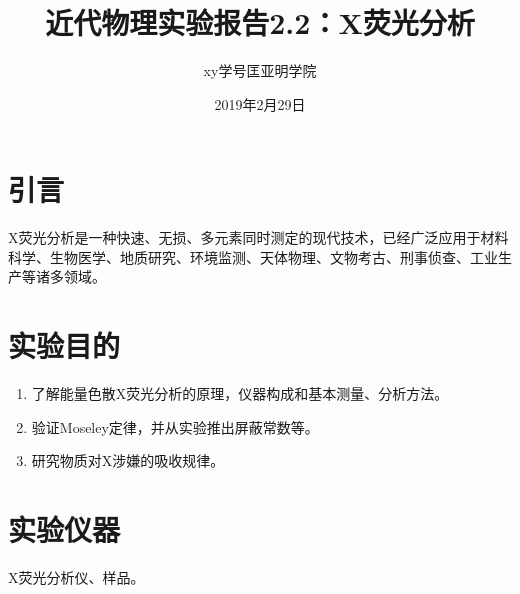 \documentclass[a4paper]{article}
\title{近代物理实验报告2.2：X荧光分析}
\author{xy\quad 学号\quad 匡亚明学院}
\date{2019年2月29日}
\begin{document}
\maketitle


\section{引言}
X荧光分析是一种快速、无损、多元素同时测定的现代技术，已经广泛应用于材料科学、生物医学、地质研究、环境监测、天体物理、文物考古、刑事侦查、工业生产等诸多领域。

\section{实验目的}
\begin{enumerate}
\item 了解能量色散X荧光分析的原理，仪器构成和基本测量、分析方法。
\item 验证Moseley定律，并从实验推出屏蔽常数等。
\item 研究物质对X涉嫌的吸收规律。
\end{enumerate}

\section{实验仪器}
X荧光分析仪、样品。
\end{document}
